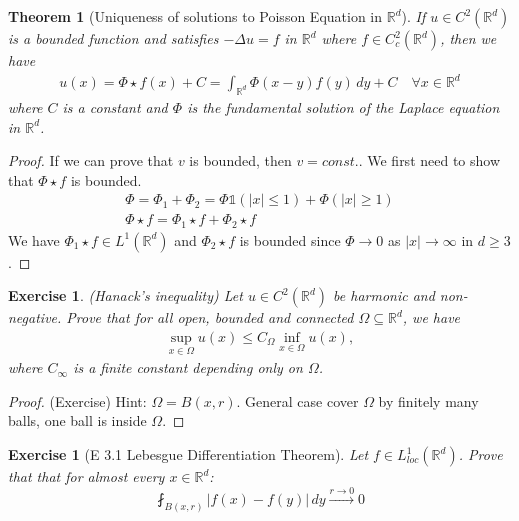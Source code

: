 \documentclass{report}
\theoremstyle{tommy}
\newtheorem{thm}[defn]{Theorem}
\newtheorem{ex}[defn]{Exercise}
\begin{document}
  \begin{thm}[Uniqueness of solutions to Poisson Equation in \(\mathbb{R}^d\)]
    If \(u \in C^2(\mathbb{R}^d)\) is a bounded function and satisfies \(- \Delta u = f\) in \(\mathbb{R}^d\) where \(f \in C_c^2(\mathbb{R}^d)\), then we have
    \begin{align*}
      u(x) = \Phi \star f(x) + C = \int_{\mathbb{R}^d} \Phi(x-y)f(y) \, dy + C \quad \forall x \in \mathbb{R}^d
    \end{align*}
    where \(C\) is a constant and \(\Phi\) is the fundamental solution of the Laplace equation in \(\mathbb{R}^d\).
  \end{thm}

  \begin{proof}
    If we can prove that \(v\) is bounded, then \(v = const.\). We first need to show that \(\Phi \star f\) is bounded.
    \begin{align*}
      \Phi = \Phi_1 + \Phi_2 = \Phi \mathbb{1}(|x| \le 1) + \Phi(|x| \ge 1) \\
      \Phi \star f = \Phi_1 \star f + \Phi_2 \star f
    \end{align*}
    We have \(\Phi_1 \star f \in L^1(\mathbb{R}^d)\) and \(\Phi_2 \star f\) is bounded since \(\Phi \to 0\)  as \(|x| \to \infty\)  in \(d \ge 3\).
  \end{proof}

  \begin{ex} (Hanack's inequality)
    Let \(u \in C^2(\mathbb{R}^d)\) be harmonic and non-negative. Prove that for all open, bounded and connected \(\Omega \subseteq \mathbb{R}^d\), we have
    \begin{align*}
      \sup_{x \in \Omega} u(x) \le C_\Omega \inf_{x \in \Omega} u(x),
    \end{align*}
    where \(C_\infty\) is a finite constant depending only on \(\Omega\).
  \end{ex}

  \begin{proof} (Exercise)
    Hint: \(\Omega = B(x,r)\). General case cover \(\Omega\) by finitely many balls, one ball is inside \(\Omega\).
  \end{proof}


  \begin{ex}[E 3.1 Lebesgue Differentiation Theorem]
    Let \(f \in L_{loc}^1(\mathbb{R}^d)\). Prove that that for almost every \(x \in \mathbb{R}^d\):
    \[\fint_{B(x,r)} |f(x) - f(y)| \, dy \xrightarrow{r \to 0} 0\]
  \end{ex}
\end{document}
